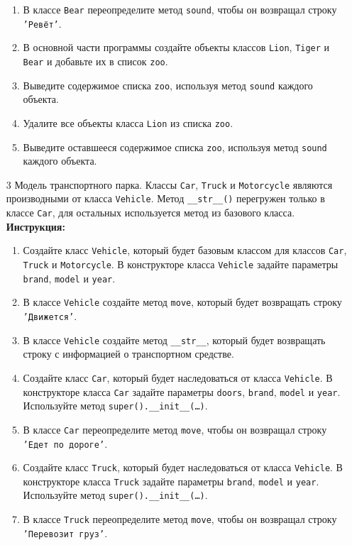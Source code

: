 \begin{enumerate}
\begin{enumerate}
    \item В классе \texttt{Bear} переопределите метод \texttt{sound}, чтобы он возвращал строку \texttt{'Ревёт'}.
    \item В основной части программы создайте объекты классов \texttt{Lion}, \texttt{Tiger} и \texttt{Bear} и добавьте их в список \texttt{zoo}.
    \item Выведите содержимое списка \texttt{zoo}, используя метод \texttt{sound} каждого объекта.
    \item Удалите все объекты класса \texttt{Lion} из списка \texttt{zoo}.
    \item Выведите оставшееся содержимое списка \texttt{zoo}, используя метод \texttt{sound} каждого объекта.
\end{enumerate}
\item[3]
Модель транспортного парка. Классы \texttt{Car}, \texttt{Truck} и \texttt{Motorcycle} являются производными от класса \texttt{Vehicle}. Метод \texttt{\_\_str\_\_()} перегружен только в классе \texttt{Car}, для остальных используется метод из базового класса.
\textbf{Инструкция:}
\begin{enumerate}
    \item Создайте класс \texttt{Vehicle}, который будет базовым классом для классов \texttt{Car}, \texttt{Truck} и \texttt{Motorcycle}. В конструкторе класса \texttt{Vehicle} задайте параметры \texttt{brand}, \texttt{model} и \texttt{year}.
    \item В классе \texttt{Vehicle} создайте метод \texttt{move}, который будет возвращать строку \texttt{'Движется'}.
    \item В классе \texttt{Vehicle} создайте метод \texttt{\_\_str\_\_}, который будет возвращать строку с информацией о транспортном средстве.
    \item Создайте класс \texttt{Car}, который будет наследоваться от класса \texttt{Vehicle}. В конструкторе класса \texttt{Car} задайте параметры \texttt{doors}, \texttt{brand}, \texttt{model} и \texttt{year}. Используйте метод \texttt{super().\_\_init\_\_(\ldots)}.
    \item В классе \texttt{Car} переопределите метод \texttt{move}, чтобы он возвращал строку \texttt{'Едет по дороге'}.
    \item Создайте класс \texttt{Truck}, который будет наследоваться от класса \texttt{Vehicle}. В конструкторе класса \texttt{Truck} задайте параметры \texttt{brand}, \texttt{model} и \texttt{year}. Используйте метод \texttt{super().\_\_init\_\_(\ldots)}.
    \item В классе \texttt{Truck} переопределите метод \texttt{move}, чтобы он возвращал строку \texttt{'Перевозит груз'}.

\end{enumerate}
\end{enumerate}
